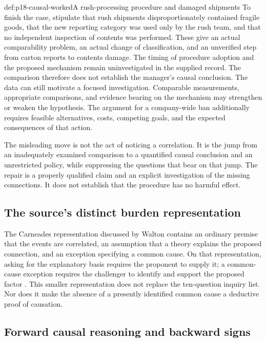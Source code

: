 \begin{hbexample}{def:p18-causal-worked}{A rush-processing procedure and damaged shipments}
To finish the case, stipulate that rush shipments disproportionately
contained fragile goods, that the new reporting category was used only
by the rush team, and that no independent inspection of contents was
performed. These give an actual comparability problem, an actual change
of classification, and an unverified step from carton reports to contents
damage. The timing of procedure adoption and the proposed mechanism
remain uninvestigated in the supplied record.
The comparison therefore does not establish the manager's causal conclusion.
The data can still motivate a focused investigation.
Comparable measurements, appropriate comparisons, and evidence bearing
on the mechanism may strengthen or weaken the hypothesis.
The argument for a company-wide ban additionally requires feasible
alternatives, costs, competing goals, and the expected consequences
of that action.

The misleading move is not the act of noticing a correlation.
It is the jump from an inadequately examined comparison to a quantified
causal conclusion and an unrestricted policy, while suppressing the
questions that bear on that jump. The repair is a properly qualified
claim and an explicit investigation of the missing connections.
It does not establish that the procedure has no harmful effect.
\end{hbexample}

\subsection{The source's distinct burden representation}

The Carneades representation discussed by Walton contains an ordinary
premise that the events are correlated, an assumption that a theory
explains the proposed connection, and an exception specifying a common
cause. On that representation, asking for the explanatory basis requires
the proponent to supply it; a common-cause exception requires the
challenger to identify and support the proposed factor
\cite[pp.~185--186, 203--204]{Walton2016ArgumentEvaluation}.
This smaller representation does not replace the ten-question inquiry
list. Nor does it make the absence of a presently identified common
cause a deductive proof of causation.

\subsection{Forward causal reasoning and backward signs}

